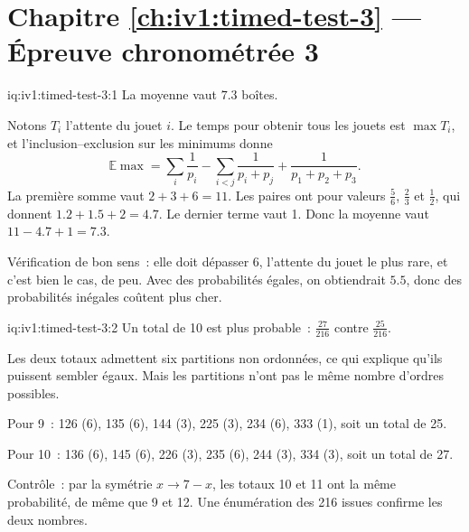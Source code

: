 \section*{Chapitre \ref{ch:iv1:timed-test-3} --- Épreuve chronométrée 3}

\begin{solution}{iq:iv1:timed-test-3:1}
La moyenne vaut $7.3$ boîtes.

Notons $T_i$ l'attente du jouet $i$. Le temps pour obtenir tous les jouets est $\max T_i$, et l'inclusion--exclusion sur les minimums donne
\[
\mathbb{E}\max = \sum_i\frac{1}{p_i} - \sum_{i < j}\frac{1}{p_i + p_j} + \frac{1}{p_1 + p_2 + p_3}.
\]
La première somme vaut $2 + 3 + 6 = 11$. Les paires ont pour valeurs $\frac56$, $\frac23$ et $\frac12$, qui donnent $1.2 + 1.5 + 2 = 4.7$. Le dernier terme vaut 1. Donc la moyenne vaut $11 - 4.7 + 1 = 7.3$.

Vérification de bon sens~: elle doit dépasser 6, l'attente du jouet le plus rare, et c'est bien le cas, de peu. Avec des probabilités égales, on obtiendrait $5.5$, donc des probabilités inégales coûtent plus cher.

\end{solution}

\begin{solution}{iq:iv1:timed-test-3:2}
Un total de 10 est plus probable~: $\frac{27}{216}$ contre $\frac{25}{216}$.

Les deux totaux admettent six partitions non ordonnées, ce qui explique qu'ils puissent sembler égaux. Mais les partitions n'ont pas le même nombre d'ordres possibles.

Pour 9~: 126 (6), 135 (6), 144 (3), 225 (3), 234 (6), 333 (1), soit un total de 25.

Pour 10~: 136 (6), 145 (6), 226 (3), 235 (6), 244 (3), 334 (3), soit un total de 27.

Contrôle~: par la symétrie $x \to 7 - x$, les totaux 10 et 11 ont la même probabilité, de même que 9 et 12. Une énumération des 216 issues confirme les deux nombres.

\end{solution}

